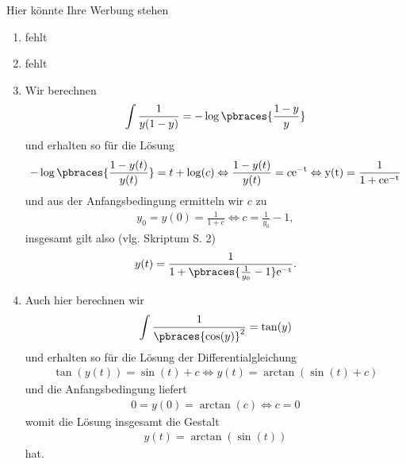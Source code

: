 \begin{solution}
    Hier könnte Ihre Werbung stehen
    \begin{enumerate}[label = \alph*)]
        \item fehlt
        \item fehlt
        \item Wir berechnen
        \begin{align*}
            \int \frac{1}{y(1 - y)} = -\log\pbraces{\frac{1 - y}{y}}
        \end{align*}
        und erhalten so für die Lösung
        \begin{align*}
            -\log\pbraces{\frac{1 - y(t)}{y(t)}} = t + \log(c) \Leftrightarrow \frac{1 - y(t)}{y(t)} = c\rm{e}^{-t} \Leftrightarrow y(t) = \frac{1}{1 + c\rm{e}^{-t}}
        \end{align*}
        und aus der Anfangsbedingung ermitteln wir $c$ zu
        \begin{align*}
            y_0 = y(0) = \frac{1}{1 + c} \Leftrightarrow c = \frac{1}{y_0} - 1,
        \end{align*}
        insgesamt gilt also (vlg. Skriptum S. 2)
        \begin{align*}
            y(t) = \frac{1}{1 + \pbraces{\frac{1}{y_0} - 1} \rm{e}^{-t}}.
        \end{align*}
        \item Auch hier berechnen wir 
        \begin{align*}
            \int \frac{1}{\pbraces{\cos(y)}^2} = \tan(y)
        \end{align*}
        und erhalten so für die Lösung der Differentialgleichung
        \begin{align*}
            \tan(y(t)) = \sin(t) + c \Leftrightarrow y(t) = \arctan(\sin(t) + c)
        \end{align*}
        und die Anfangsbedingung liefert
        \begin{align*}
            0 = y(0) = \arctan(c) \Leftrightarrow c = 0
        \end{align*}
        womit die Lösung insgesamt die Gestalt
        \begin{align*}
            y(t) = \arctan(\sin(t))
        \end{align*}
        hat.
    \end{enumerate}
\end{solution}